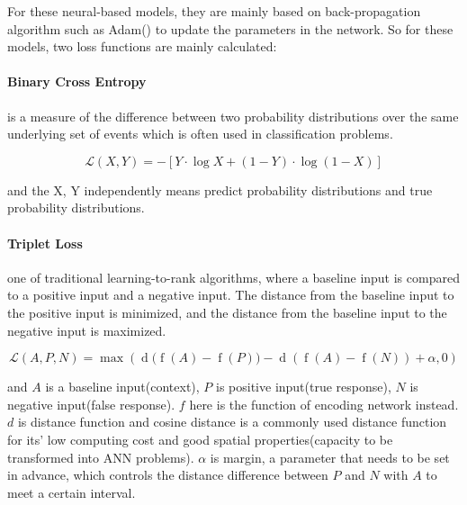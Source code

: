 \documentclass{article}
\begin{document}
For these neural-based models, they are mainly based on back-propagation algorithm such as Adam(\cite{kingma2014adam}) to update the parameters in the network. So for these models, two loss functions are mainly calculated: 
\paragraph{Binary Cross Entropy} is a measure of the difference between two probability distributions over the same underlying set of events which is often used in classification problems. 

\begin{equation}
{\mathcal {L}}(X, Y)=-\left[Y \cdot \log X+\left(1-Y \right) \cdot \log \left(1-X\right)\right]
\end{equation}

and the X, Y independently means predict probability distributions and true probability distributions. 

\paragraph{Triplet Loss} one of traditional learning-to-rank algorithms, where a baseline input is compared to a positive input and a negative input. The distance from the baseline input to the positive input is minimized, and the distance from the baseline input to the negative input is maximized. 

\begin{equation}
{\displaystyle {\mathcal {L}}\left(A,P,N\right)=\operatorname {max} \left({\operatorname{d} (\operatorname {f} \left(A\right)-\operatorname {f} \left(P\right)})-\operatorname{d}({\operatorname {f} \left(A\right)-\operatorname {f} \left(N\right)})+\alpha ,0\right)}
\end{equation}

and $A$ is a baseline input(context), $P$ is positive input(true response), $N$ is negative input(false response). $f$ here is the function of encoding network instead. $d$ is distance function and cosine distance is a commonly used distance function for its' low computing cost and good spatial properties(capacity to be transformed into ANN problems). $\alpha$ is margin, a parameter that needs to be set in advance, which controls the distance difference between $P$ and $N$ with $A$ to meet a certain interval.
\end{document}
